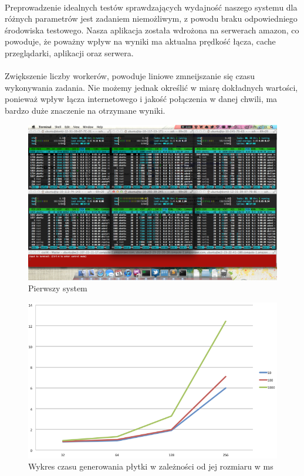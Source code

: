\documentclass[wide,a4paper,titlepage,12pt]{article}
\begin{document}
\paragraph{}
Preprowadzenie idealnych testów sprawdzających wydajność naszego systemu dla różnych parametrów jest zadaniem niemożliwym, 
z powodu braku odpowiedniego środowiska testowego. Nasza aplikacja została wdrożona na serwerach amazon, co powoduje, 
że poważny wpływ na wyniki ma aktualna prędkość łącza, cache przeglądarki, aplikacji oraz serwera.

\paragraph{}
Zwiększenie liczby workerów, powoduje liniowe zmneijszanie się czasu wykonywania zadania. Nie możemy jednak określić w miarę
dokładnych wartości, ponieważ wpływ łącza internetowego i jakość połączenia w danej chwili, ma bardzo duże znaczenie na otrzymane wyniki.

\begin{figure}[h!]
\begin{center}
\includegraphics[scale=0.33]{amazon.png}
\end{center}
\caption{Pierwszy system}
\label{fig:amazon}
\end{figure}

\begin{figure}[h!]
\begin{center}
\includegraphics[scale=0.5]{plot1.png}
\end{center}
\caption{Wykres czasu generowania płytki w zależności od jej rozmiaru w ms}
\label{fig:plot1}
\end{figure}
\end{document}

